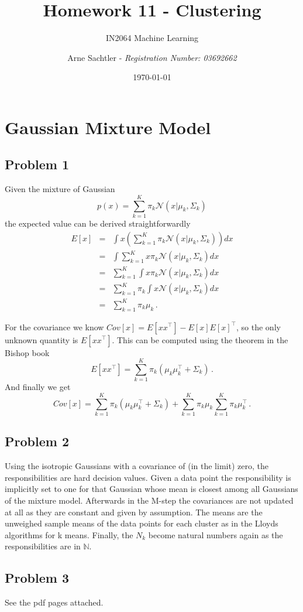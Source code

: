 \documentclass{scrartcl}
\title{Homework 11 - Clustering}
\author{Arne Sachtler - \textit{Registration Number: 03692662}}
\date{\today}
\subtitle{IN2064 Machine Learning}
\begin{document}
\maketitle
\section{Gaussian Mixture Model} %
\label{sec:gaussian_mixture_model}


\subsection{Problem 1}
Given the mixture of Gaussian
\begin{equation}
	p(x) = \sum_{k=1}^K \pi_k \mathcal{N}(x | \mu_k, \Sigma_k)
\end{equation}
the expected value can be derived straightforwardly
\begin{eqnarray}
E[x] &=& \int x \left(\sum_{k=1}^K \pi_k \mathcal{N}(x | \mu_k, \Sigma_k)\right)dx\\
&=& \int \sum_{k=1}^K x\pi_k \mathcal{N}(x | \mu_k, \Sigma_k)dx\\
&=& \sum_{k=1}^K \int x\pi_k \mathcal{N}(x | \mu_k, \Sigma_k)dx\\
&=& \sum_{k=1}^K \pi_k \int x \mathcal{N}(x | \mu_k, \Sigma_k)dx\\
&=& \sum_{k=1}^K \pi_k \mu_k \, .
\end{eqnarray}

For the covariance we know $Cov[x] = E[xx^\top] - E[x]E[x]^\top$, so the only unknown quantity is $E[xx^\top]$. This can be computed using the theorem in the Bishop book \cite[p. 82]{Bishop:2006:PRM:1162264}
\begin{equation}
	E[xx^\top] = \sum_{k=1}^K \pi_k (\mu_k \mu_k^\top + \Sigma_k)\, .
\end{equation}
And finally we get
\begin{equation}
	Cov[x] = \sum_{k=1}^K \pi_k (\mu_k \mu_k^\top + \Sigma_k) + \sum_{k=1}^K \pi_k \mu_k \sum_{k=1}^K \pi_k \mu_k^\top \, .
\end{equation}

\subsection{Problem 2}
Using the isotropic Gaussians with a covariance of (in the limit) zero, the responsibilities are hard decision values. Given a data point the responsibility is implicitly set to one for that Gaussian whose mean is closest among all Gaussians of the mixture model.
Afterwards in the M-step the covariances are not updated at all as they are constant and given by assumption. The means are the unweighed sample means of the data points for each cluster as in the Lloyds algorithms for k means. Finally, the $N_k$ become natural numbers again as the responsibilities are in $\mathbb{N}$.
\subsection{Problem 3}
See the pdf pages attached.

\printbibliography

\end{document}
